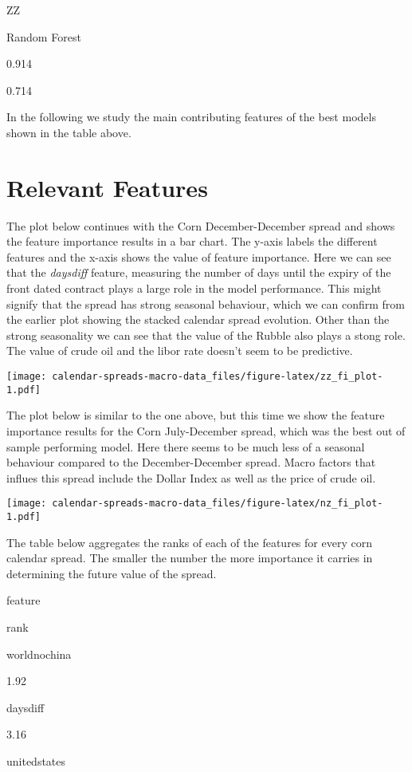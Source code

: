 \documentclass[
]{book}
\begin{document}
ZZ

Random Forest

0.914

0.714

In the following we study the main contributing features of the best models shown in the table above.

\hypertarget{relevant-features}{%
\section{Relevant Features}\label{relevant-features}}

The plot below continues with the Corn December-December spread and shows the feature importance results in a bar chart. The y-axis labels the different features and the x-axis shows the value of feature importance. Here we can see that the \emph{daysdiff} feature, measuring the number of days until the expiry of the front dated contract plays a large role in the model performance. This might signify that the spread has strong seasonal behaviour, which we can confirm from the earlier plot showing the stacked calendar spread evolution. Other than the strong seasonality we can see that the value of the Rubble also plays a stong role. The value of crude oil and the libor rate doesn't seem to be predictive.

\texttt{[image: calendar-spreads-macro-data\_files/figure-latex/zz\_fi\_plot-1.pdf]}

The plot below is similar to the one above, but this time we show the feature importance results for the Corn July-December spread, which was the best out of sample performing model. Here there seems to be much less of a seasonal behaviour compared to the December-December spread. Macro factors that influes this spread include the Dollar Index as well as the price of crude oil.

\texttt{[image: calendar-spreads-macro-data\_files/figure-latex/nz\_fi\_plot-1.pdf]}

The table below aggregates the ranks of each of the features for every corn calendar spread. The smaller the number the more importance it carries in determining the future value of the spread.

feature

rank

worldnochina

1.92

daysdiff

3.16

unitedstates
\end{document}
